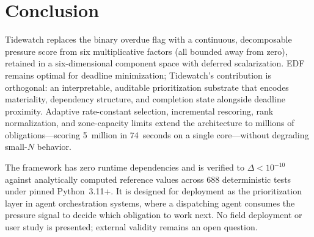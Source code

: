 \documentclass[11pt]{article}
\begin{document}
\section{Conclusion}
\label{sec:conclusion}

Tidewatch replaces the binary overdue flag with a continuous,
decomposable pressure score from six multiplicative factors
(all bounded away from zero), retained in a six-dimensional
component space with deferred scalarization.  EDF remains optimal
for deadline minimization; Tidewatch's contribution is orthogonal:
an interpretable, auditable prioritization substrate that encodes
materiality, dependency structure, and completion state alongside
deadline proximity.  Adaptive rate-constant selection, incremental
rescoring, rank normalization, and zone-capacity limits extend the
architecture to millions of obligations---scoring 5~million in
74~seconds on a single core---without degrading small-$N$ behavior.

The framework has zero runtime dependencies and is verified to
$\Delta < 10^{-10}$ against analytically computed reference values
across 688 deterministic tests under pinned Python~3.11+.  It is
designed for deployment as the prioritization layer in agent
orchestration systems, where a dispatching agent consumes the
pressure signal to decide which obligation to work next.  No field
deployment or user study is presented; external validity remains an
open question.


\end{document}
